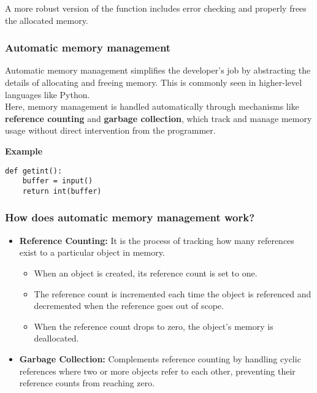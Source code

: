 \documentclass[12pt]{article}
\begin{document}
A more robust version of the function includes error checking and properly frees the allocated memory.


\subsubsection{Automatic memory management}
Automatic memory management simplifies the developer's job by abstracting the details of allocating and freeing memory. This is commonly seen in higher-level languages like Python.\\
Here, memory management is handled automatically through mechanisms like \textbf{reference counting} and \textbf{garbage collection}, which track and manage memory usage without direct intervention from the programmer.


\textbf{Example}
\begin{verbatim}
def getint():
    buffer = input()
    return int(buffer)
\end{verbatim}


\subsubsection{How does automatic memory management work?}

\begin{itemize}
    \item \textbf{Reference Counting:} It is the process of tracking how many references exist to a particular object in memory.
    \begin{itemize}
        \item When an object is created, its reference count is set to one.
        \item The reference count is incremented each time the object is referenced and decremented when the reference goes out of scope.
        \item When the reference count drops to zero, the object's memory is deallocated.
    \end{itemize}
    \item \textbf{Garbage Collection:} Complements reference counting by handling cyclic references where two or more objects refer to each other, preventing their reference counts from reaching zero.
\end{itemize}


\end{document}
